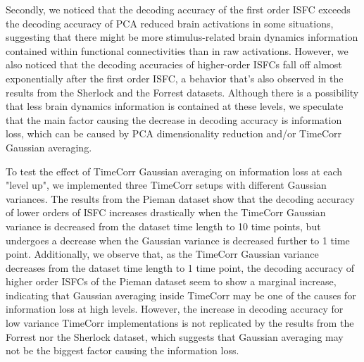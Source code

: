 \documentclass[11pt]{article}
\begin{document}
\begin{enumerate}
Secondly, we noticed that the decoding accuracy of the first order ISFC exceeds the decoding accuracy of PCA reduced brain activations in some situations, suggesting that there might be more stimulus-related brain dynamics information contained within functional connectivities than in raw activations. However, we also noticed that the decoding accuracies of higher-order ISFCs fall off almost exponentially after the first order ISFC, a behavior that's also observed in the results from the Sherlock and the Forrest datasets. Although there is a possibility that less brain dynamics information is contained at these levels, we speculate that the main factor causing the decrease in decoding accuracy is information loss, which can be caused by PCA dimensionality reduction and/or TimeCorr Gaussian averaging.

To test the effect of TimeCorr Gaussian averaging on information loss at each "level up", we implemented three TimeCorr setups with different Gaussian variances. The results from the Pieman dataset show that the decoding accuracy of lower orders of ISFC increases drastically when the TimeCorr Gaussian variance is decreased from the dataset time length to 10 time points, but undergoes a decrease when the Gaussian variance is decreased further to 1 time point. Additionally, we observe that, as the TimeCorr Gaussian variance decreases from the dataset time length to 1 time point, the decoding accuracy of higher order ISFCs of the Pieman dataset seem to show a marginal increase, indicating that Gaussian averaging inside TimeCorr may be one of the causes for information loss at high levels. However, the increase in decoding accuracy for low variance TimeCorr implementations is not replicated by the results from the Forrest nor the Sherlock dataset, which suggests that Gaussian averaging may not be the biggest factor causing the information loss.


\end{enumerate}
\end{document}
